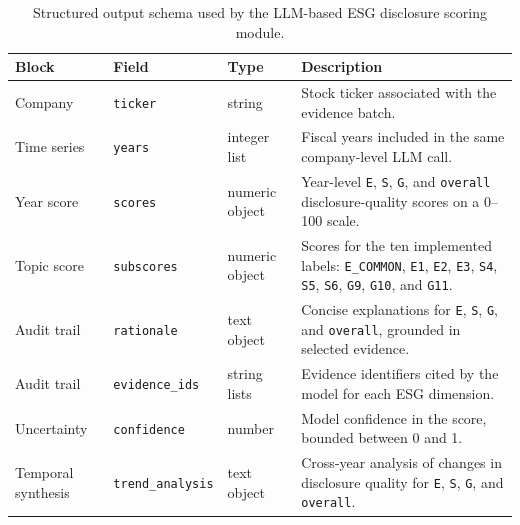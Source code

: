\begin{table}[t]
\centering
\caption{Structured output schema used by the LLM-based ESG disclosure scoring module.}
\label{tab:llm_scoring_schema}
\small
\begin{tabularx}{\textwidth}{lllX}
\toprule
\textbf{Block} & \textbf{Field} & \textbf{Type} & \textbf{Description} \\
\midrule
Company & \texttt{ticker} & string & Stock ticker associated with the evidence batch. \\
Time series & \texttt{years} & integer list & Fiscal years included in the same company-level LLM call. \\
Year score & \texttt{scores} & numeric object & Year-level \texttt{E}, \texttt{S}, \texttt{G}, and \texttt{overall} disclosure-quality scores on a 0--100 scale. \\
Topic score & \texttt{subscores} & numeric object & Scores for the ten implemented labels: \texttt{E\_COMMON}, \texttt{E1}, \texttt{E2}, \texttt{E3}, \texttt{S4}, \texttt{S5}, \texttt{S6}, \texttt{G9}, \texttt{G10}, and \texttt{G11}. \\
Audit trail & \texttt{rationale} & text object & Concise explanations for \texttt{E}, \texttt{S}, \texttt{G}, and \texttt{overall}, grounded in selected evidence. \\
Audit trail & \texttt{evidence\_ids} & string lists & Evidence identifiers cited by the model for each ESG dimension. \\
Uncertainty & \texttt{confidence} & number & Model confidence in the score, bounded between 0 and 1. \\
Temporal synthesis & \texttt{trend\_analysis} & text object & Cross-year analysis of changes in disclosure quality for \texttt{E}, \texttt{S}, \texttt{G}, and \texttt{overall}. \\
\bottomrule
\end{tabularx}
\end{table}
